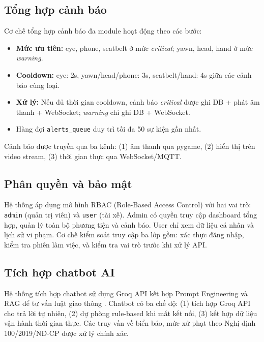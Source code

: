 \subsection{Tổng hợp cảnh báo}

Cơ chế tổng hợp cảnh báo đa module hoạt động theo các bước:

\begin{itemize}[leftmargin=*,nosep]
  \item \textbf{Mức ưu tiên:} eye, phone, seatbelt ở mức \textit{critical}; yawn, head, hand ở mức \textit{warning}.
  \item \textbf{Cooldown:} eye: 2s, yawn/head/phone: 3s, seatbelt/hand: 4s giữa các cảnh báo cùng loại.
  \item \textbf{Xử lý:} Nếu đủ thời gian cooldown, cảnh báo \textit{critical} được ghi DB + phát âm thanh + WebSocket; \textit{warning} chỉ ghi DB + WebSocket.
  \item Hàng đợi {\tt alerts\_queue} duy trì tối đa 50 sự kiện gần nhất.
\end{itemize}

Cảnh báo được truyền qua ba kênh: (1) âm thanh qua pygame, (2) hiển thị trên video stream, (3) thời gian thực qua WebSocket/MQTT.


\subsection{Phân quyền và bảo mật}

Hệ thống áp dụng mô hình RBAC (Role-Based Access Control) với hai vai trò: {\tt admin} (quản trị viên) và {\tt user} (tài xế). Admin có quyền truy cập dashboard tổng hợp, quản lý toàn bộ phương tiện và cảnh báo. User chỉ xem dữ liệu cá nhân và lịch sử vi phạm. Cơ chế kiểm soát truy cập ba lớp gồm: xác thực đăng nhập, kiểm tra phiên làm việc, và kiểm tra vai trò trước khi xử lý API.

\subsection{Tích hợp chatbot AI}

Hệ thống tích hợp chatbot sử dụng Groq API kết hợp Prompt Engineering và RAG để tư vấn luật giao thông \cite{minhvt2020}. Chatbot có ba chế độ: (1) tích hợp Groq API cho trả lời tự nhiên, (2) dự phòng rule-based khi mất kết nối, (3) kết hợp dữ liệu vận hành thời gian thực. Các truy vấn về biển báo, mức xử phạt theo Nghị định 100/2019/NĐ-CP được xử lý chính xác.
